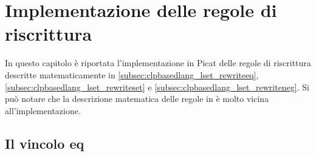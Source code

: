 \documentclass[12pt,a4paper,openright]{book} %
\begin{document}
\clearpage




\chapter{Implementazione delle regole di riscrittura}
\label{ch:impl}

\minitoc

In questo capitolo è riportata l'implementazione in Picat delle regole di riscrittura descritte matematicamente in \ref{subsec:clpbasedlang_lset_rewriteeq}, \ref{subsec:clpbasedlang_lset_rewriteset} e \ref{subsec:clpbasedlang_lset_rewriteneg}. Si può notare che la descrizione matematica delle regole in \cite{Rossi18} è molto vicina all’implementazione.

\section{Il vincolo eq}
\end{document}
